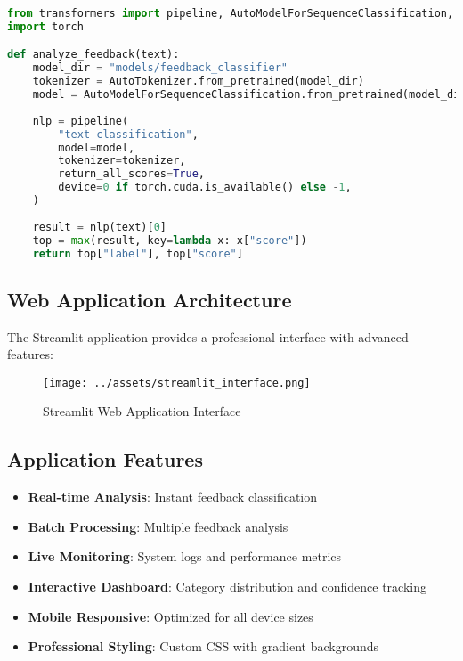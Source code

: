 \documentclass[11pt,a4paper]{article}
\begin{document}
\begin{lstlisting}[style=code,language=Python]
from transformers import pipeline, AutoModelForSequenceClassification, AutoTokenizer
import torch

def analyze_feedback(text):
    model_dir = "models/feedback_classifier"
    tokenizer = AutoTokenizer.from_pretrained(model_dir)
    model = AutoModelForSequenceClassification.from_pretrained(model_dir)
    
    nlp = pipeline(
        "text-classification",
        model=model,
        tokenizer=tokenizer,
        return_all_scores=True,
        device=0 if torch.cuda.is_available() else -1,
    )
    
    result = nlp(text)[0]
    top = max(result, key=lambda x: x["score"])
    return top["label"], top["score"]
\end{lstlisting}

\subsection{Web Application Architecture}
The Streamlit application provides a professional interface with advanced features:

\begin{figure}[h!]
  \centering
  \texttt{[image: ../assets/streamlit\_interface.png]}
  \caption{Streamlit Web Application Interface}
\end{figure}

\subsection{Application Features}
\begin{itemize}
  \item \textbf{Real-time Analysis}: Instant feedback classification
  \item \textbf{Batch Processing}: Multiple feedback analysis
  \item \textbf{Live Monitoring}: System logs and performance metrics
  \item \textbf{Interactive Dashboard}: Category distribution and confidence tracking
  \item \textbf{Mobile Responsive}: Optimized for all device sizes
  \item \textbf{Professional Styling}: Custom CSS with gradient backgrounds
\end{itemize}
\end{document}
